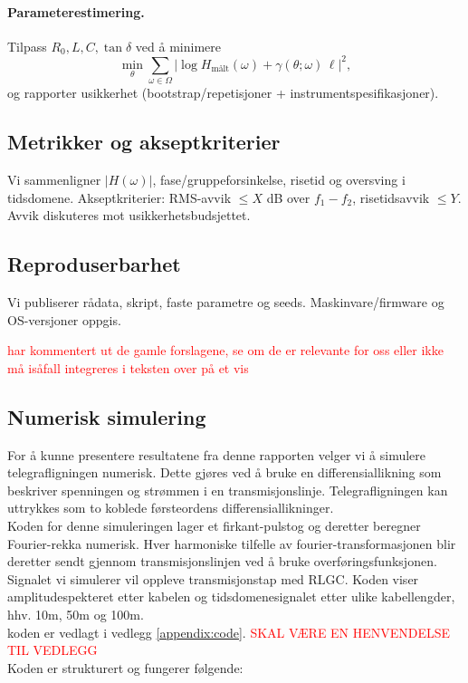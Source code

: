 \paragraph{Parameterestimering.}
Tilpass $R_0, L, C, \tan\delta$ ved å minimere
\[
\min_\theta \sum_{\omega\in\Omega} \left|\log H_\text{målt}(\omega) + \gamma(\theta;\omega)\,\ell\right|^2,
\]
og rapporter usikkerhet (bootstrap/repetisjoner + instrumentspesifikasjoner).

\subsection{Metrikker og akseptkriterier}
Vi sammenligner $|H(\omega)|$, fase/gruppeforsinkelse, risetid og oversving i tidsdomene. Akseptkriterier:
RMS-avvik $\leq X$ dB over $f_1 - f_2$, risetidsavvik $\leq Y$. Avvik diskuteres mot usikkerhetsbudsjettet.

\subsection{Reproduserbarhet}
Vi publiserer rådata, skript, faste parametre og seeds. Maskinvare/firmware og OS-versjoner oppgis.

\textcolor{red}{har kommentert ut de gamle forslagene, se om de er relevante for oss eller ikke \\ må isåfall integreres i teksten over på et vis}




\iffalse
\subsection{Numerisk simulering}
For å kunne presentere resultatene fra denne rapporten velger vi å simulere telegrafligningen numerisk. Dette gjøres ved å bruke en differensiallikning som beskriver spenningen og strømmen i en transmisjonslinje. Telegrafligningen kan uttrykkes som to koblede førsteordens differensiallikninger. \\ Koden for denne simuleringen lager et firkant-pulstog og deretter beregner Fourier-rekka numerisk. Hver harmoniske tilfelle av fourier-transformasjonen blir deretter sendt gjennom transmisjonslinjen ved å bruke overføringsfunksjonen. Signalet vi simulerer vil oppleve transmisjonstap med RLGC. Koden viser amplitudespekteret etter kabelen og tidsdomenesignalet etter ulike kabellengder, hhv. 10m, 50m og 100m. \\ koden er vedlagt i vedlegg \ref{appendix:code}. \textcolor{red}{SKAL VÆRE EN HENVENDELSE TIL VEDLEGG} \\ Koden er strukturert og fungerer følgende:



